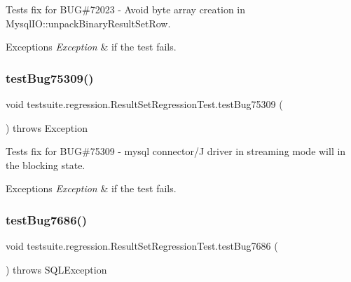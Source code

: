 Tests fix for B\+UG\#72023 -\/ Avoid byte array creation in Mysql\+I\+O\+::unpack\+Binary\+Result\+Set\+Row.


\begin{DoxyExceptions}{Exceptions}
{\em Exception} & if the test fails. \\
\hline
\end{DoxyExceptions}
\mbox{\label{classtestsuite_1_1regression_1_1_result_set_regression_test_a21e609d74da6fad0483aeeec66375c7d}} 
\subsubsection{\texorpdfstring{test\+Bug75309()}{testBug75309()}}
{\footnotesize\ttfamily void testsuite.\+regression.\+Result\+Set\+Regression\+Test.\+test\+Bug75309 (\begin{DoxyParamCaption}{ }\end{DoxyParamCaption}) throws Exception}

Tests fix for B\+UG\#75309 -\/ mysql connector/J driver in streaming mode will in the blocking state.


\begin{DoxyExceptions}{Exceptions}
{\em Exception} & if the test fails. \\
\hline
\end{DoxyExceptions}
\mbox{\label{classtestsuite_1_1regression_1_1_result_set_regression_test_ac63ee9e876d4d96c9d1ca956622cd2ec}} 
\subsubsection{\texorpdfstring{test\+Bug7686()}{testBug7686()}}
{\footnotesize\ttfamily void testsuite.\+regression.\+Result\+Set\+Regression\+Test.\+test\+Bug7686 (\begin{DoxyParamCaption}{ }\end{DoxyParamCaption}) throws S\+Q\+L\+Exception}

